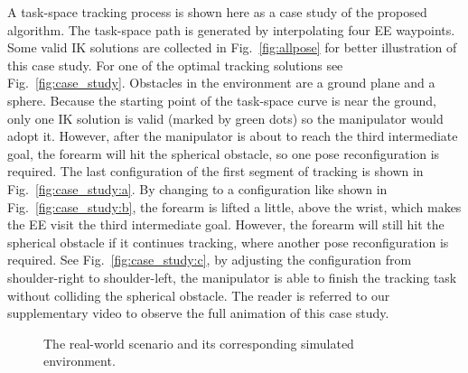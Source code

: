 \documentclass[letterpaper, 10 pt, journal, twoside]{ieeetran}  %
\begin{document}
A task-space tracking process is shown here as a case study of the proposed algorithm. 
The task-space path is generated by interpolating four EE waypoints. 
Some valid IK solutions are collected in Fig.~\ref{fig:allpose} for better illustration of this case study. 
For one of the optimal tracking solutions see Fig.~\ref{fig:case_study}. 
Obstacles in the environment are a ground plane and a sphere. 
Because the starting point of the task-space curve is near the ground, only one IK solution is valid (marked by green dots) so the manipulator would adopt it. 
However, after the manipulator is about to reach the third intermediate goal, the forearm will hit the spherical obstacle, so one pose reconfiguration is required. 
The last configuration of the first segment of tracking is shown in Fig.~\ref{fig:case_study:a}. 
By changing to a configuration like shown in Fig.~\ref{fig:case_study:b}, the forearm is lifted a little, above the wrist, which makes the EE visit the third intermediate goal. However, the forearm will still hit the spherical obstacle if it continues tracking, where another pose reconfiguration is required. 
See Fig.~\ref{fig:case_study:c}, by adjusting the configuration from shoulder-right to shoulder-left, the manipulator is able to finish the tracking task without colliding the spherical obstacle.
The reader is referred to our supplementary video to observe the full animation of this case study. 



\begin{figure}[t]
\centering
{}
\caption{The real-world scenario and its corresponding simulated environment. }\label{fig:realworld_illustration}
\vspace{-0.5cm}
\end{figure}
\end{document}
